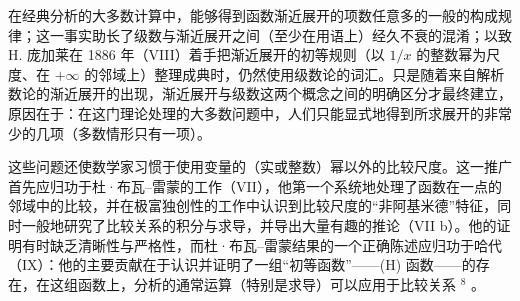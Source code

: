 在经典分析的大多数计算中，能够得到函数渐近展开的项数任意多的一般的构成规律；这一事实助长了级数与渐近展开之间（至少在用语上）经久不衰的混淆；以致 H. 庞加莱在 1886 年（VIII）着手把渐近展开的初等规则（以 \(1 / x\) 的整数幂为尺度、在 \(+\infty\) 的邻域上）整理成典时，仍然使用级数论的词汇。只是随着来自解析数论的渐近展开的出现，渐近展开与级数这两个概念之间的明确区分才最终建立，原因在于：在这门理论处理的大多数问题中，人们只能显式地得到所求展开的非常少的几项（多数情形只有一项）。

这些问题还使数学家习惯于使用变量的（实或整数）幂以外的比较尺度。这一推广首先应归功于杜·布瓦–雷蒙的工作（VII），他第一个系统地处理了函数在一点的邻域中的比较，并在极富独创性的工作中认识到比较尺度的“非阿基米德”特征，同时一般地研究了比较关系的积分与求导，并导出大量有趣的推论（VII b）。他的证明有时缺乏清晰性与严格性，而杜·布瓦–雷蒙结果的一个正确陈述应归功于哈代（IX）：他的主要贡献在于认识并证明了一组“初等函数”——(H) 函数——的存在，在这组函数上，分析的通常运算（特别是求导）可以应用于比较关系 \({}^{8}\) 。

